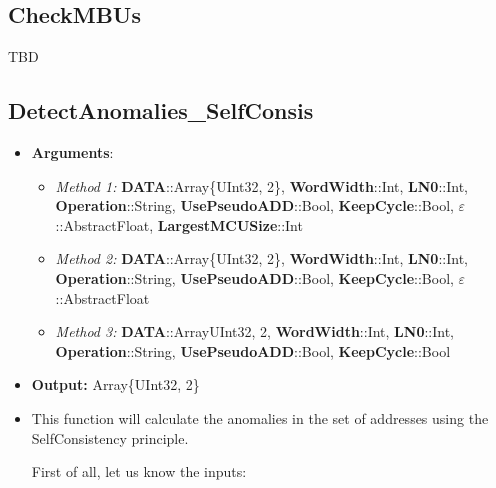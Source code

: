 \subsection*{CheckMBUs}

TBD

\subsection*{DetectAnomalies\_SelfConsis}
\begin{itemize}
	\item \textbf{Arguments}:
	\begin{itemize}
		\item  \textit{Method 1: }\textbf{DATA}::Array\{UInt32, 2\}, 
		\textbf{WordWidth}::Int,
		\textbf{LN0}::Int,
		\textbf{Operation}::String,
		\textbf{UsePseudoADD}::Bool,
		\textbf{KeepCycle}::Bool,
		\textbf{\(\varepsilon\)}::AbstractFloat,
		\textbf{LargestMCUSize}::Int
		\item  \textit{Method 2: }\textbf{DATA}::Array\{UInt32, 2\}, 
		\textbf{WordWidth}::Int,
		\textbf{LN0}::Int,
		\textbf{Operation}::String,
		\textbf{UsePseudoADD}::Bool,
		\textbf{KeepCycle}::Bool,
		\textbf{\(\varepsilon\)}::AbstractFloat
		\item  \textit{Method 3: }\textbf{DATA}::Array{UInt32, 2}, 
		\textbf{WordWidth}::Int,
		\textbf{LN0}::Int,
		\textbf{Operation}::String,
		\textbf{UsePseudoADD}::Bool,
		\textbf{KeepCycle}::Bool
	\end{itemize}
	\item \textbf{Output: } Array\{UInt32, 2\}	
	\item This function will calculate the anomalies in the set of addresses using the SelfConsistency principle.

	 First of all, let us know the inputs:
	 \begin{itemize}
	

\end{itemize}
\end{itemize}
